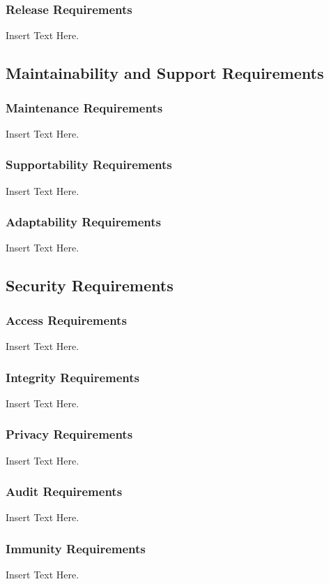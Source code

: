 \documentclass [12pt]{article}
\begin{document}
\subsubsection{Release Requirements}
		Insert Text Here.		

\subsection{Maintainability and Support Requirements }
\subsubsection{Maintenance Requirements }
		Insert Text Here.

\subsubsection{Supportability Requirements }
		Insert Text Here.

\subsubsection{Adaptability Requirements}
		Insert Text Here.


\subsection{Security Requirements }
\subsubsection{Access Requirements }
		Insert Text Here.

\subsubsection{Integrity Requirements }
		Insert Text Here.

\subsubsection{Privacy Requirements }
		Insert Text Here.

\subsubsection{Audit  Requirements }
		Insert Text Here. 

\subsubsection{Immunity Requirements  }
		Insert Text Here.
\end{document}
